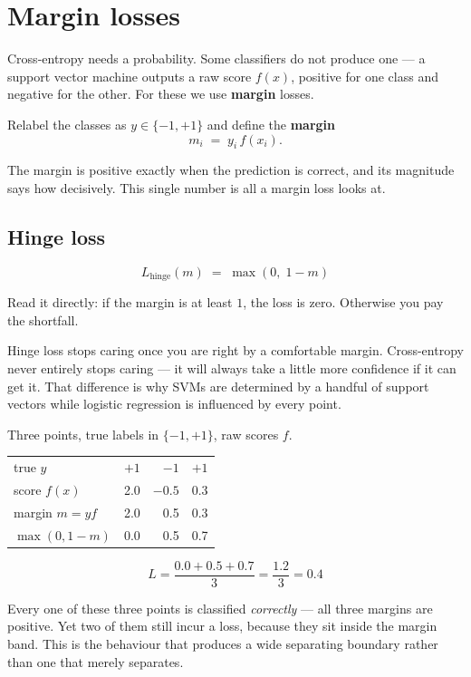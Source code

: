 \documentclass[11pt]{article}
\begin{document}
\newpage
\section{Margin losses}
\label{sec:margin}

Cross-entropy needs a probability. Some classifiers do not produce one --- a
support vector machine outputs a raw score $f(x)$, positive for one class and
negative for the other. For these we use \textbf{margin} losses.

Relabel the classes as $y \in \{-1, +1\}$ and define the \textbf{margin}
\[
  m_i \;=\; y_i \, f(x_i) .
\]

The margin is positive exactly when the prediction is correct, and its
magnitude says how decisively. This single number is all a margin loss looks at.

\subsection{Hinge loss}

\[
  L_{\mathrm{hinge}}(m) \;=\; \max(0,\; 1 - m)
\]

Read it directly: if the margin is at least $1$, the loss is zero. Otherwise
you pay the shortfall.

\begin{keyidea}
Hinge loss stops caring once you are right by a comfortable margin. Cross-entropy
never entirely stops caring --- it will always take a little more confidence if
it can get it. That difference is why SVMs are determined by a handful of
support vectors while logistic regression is influenced by every point.
\end{keyidea}

\begin{worked}
Three points, true labels in $\{-1,+1\}$, raw scores $f$.

\begin{center}
\begin{tabular}{@{}lrrr@{}}
\toprule
true $y$        & $+1$ & $-1$ & $+1$\\
score $f(x)$    & 2.0  & $-0.5$ & 0.3\\
\midrule
margin $m=yf$   & 2.0  & 0.5  & 0.3\\
$\max(0, 1-m)$  & 0.0  & 0.5  & 0.7\\
\bottomrule
\end{tabular}
\end{center}

\[
  L = \frac{0.0 + 0.5 + 0.7}{3} = \frac{1.2}{3} = \mathbf{0.4}
\]

Every one of these three points is classified \emph{correctly} --- all three
margins are positive. Yet two of them still incur a loss, because they sit
inside the margin band. This is the behaviour that produces a wide separating
boundary rather than one that merely separates.
\end{worked}
\end{document}
